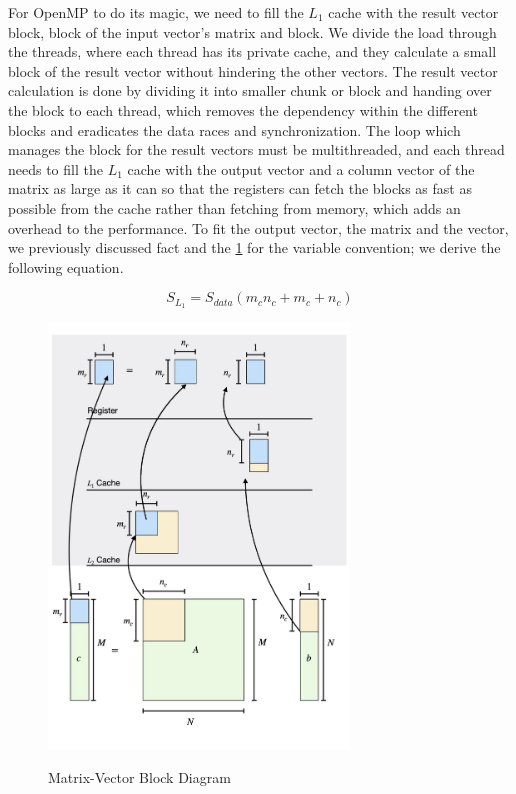 For OpenMP to do its magic, we need to fill the $L_1$ cache with 
the result vector block, block of the input vector's matrix and block. 
We divide the load through the threads, where each thread has 
its private cache, and they calculate a small block of the 
result vector without hindering the other vectors. 
The result vector calculation is done by dividing it into 
smaller chunk or block and handing over the block to each thread, 
which removes the dependency within the different blocks and 
eradicates the data races and synchronization. 
The loop which manages the block for the result 
vectors must be multithreaded, and each thread needs to fill 
the $L_1$ cache with the output vector and a column vector of the matrix 
as large as it can so that the registers can fetch the blocks as fast 
as possible from the cache rather than fetching from memory, which adds 
an overhead to the performance. To fit the output vector, the matrix and the vector, 
we previously discussed fact and the \ref{fig:mtv_col_block_diagram} 
for the variable convention; we derive the following equation.

\begin{equation}
    S_{L_1} = S_{data}(m_cn_c + m_c + n_c)
    \label{eq:mtv_col_block} 
\end{equation}

\begin{figure}[htb]
    \centering
    \caption{Matrix-Vector Block Diagram}
    \includegraphics[width=8cm]{../assets/mtv/col_major/block_diagram.png} %
    \label{fig:mtv_col_block_diagram}
\end{figure}


